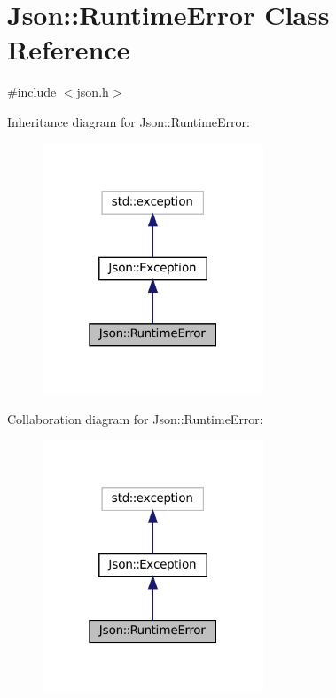 \hypertarget{classJson_1_1RuntimeError}{}\section{Json\+:\+:Runtime\+Error Class Reference}
\label{classJson_1_1RuntimeError}


{\ttfamily \#include $<$json.\+h$>$}



Inheritance diagram for Json\+:\+:Runtime\+Error\+:
\nopagebreak
\begin{figure}[H]
\begin{center}
\leavevmode
\includegraphics[width=187pt]{classJson_1_1RuntimeError__inherit__graph}
\end{center}
\end{figure}


Collaboration diagram for Json\+:\+:Runtime\+Error\+:
\nopagebreak
\begin{figure}[H]
\begin{center}
\leavevmode
\includegraphics[width=187pt]{classJson_1_1RuntimeError__coll__graph}
\end{center}
\end{figure}
